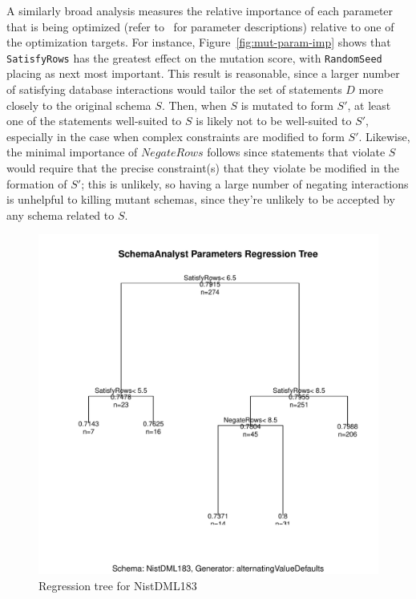 \documentclass[a4paper,twocolumn]{article}
\begin{document}
A similarly broad analysis measures the relative importance of each parameter that is being optimized (refer to~ for parameter descriptions) relative to one of the optimization targets. For instance, Figure~\ref{fig:mut-param-imp} shows that \texttt{SatisfyRows} has the greatest effect on the mutation score, with \texttt{RandomSeed} placing as next most important. This result is reasonable, since a larger number of satisfying database interactions would tailor the set of statements $D$ more closely to the original schema $S$. Then, when $S$ is mutated to form $S'$, at least one of the statements well-suited to $S$ is likely not to be well-suited to $S'$, especially in the case when complex constraints are modified to form $S'$. Likewise, the minimal importance of $NegateRows$ follows since statements that violate $S$ would require that the precise constraint(s) that they violate be modified in the formation of $S'$; this is unlikely, so having a large number of negating interactions is unhelpful to killing mutant schemas, since they're unlikely to be accepted by any schema related to $S$.


\begin{figure}[t]
\begin{center}
\includegraphics[width=0.90\columnwidth]{NistDML183-regressiontree.pdf}
\caption{Regression tree for NistDML183}
\end{center}
\label{fig:CART}
\end{figure}
\end{document}
